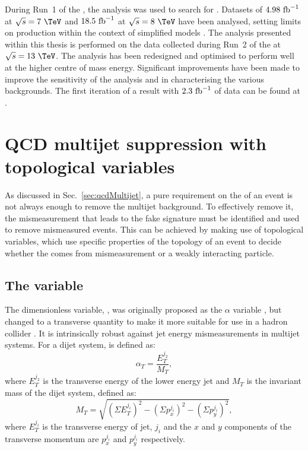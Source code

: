 During Run~1 of the \LHC, the \alphat analysis was used
to search for \SUSY. Datasets of $4.98~\text{fb}^{-1}$ at
$\sqrt{s}=7~\tev$ and $18.5~\text{fb}^{-1}$ at $\sqrt{s}=8~\tev$ have been
analysed, setting limits on \SUSY production within the context of
simplified models
\cite{Chatrchyan:2011zy,Khachatryan:2011tk,Chatrchyan:2012wa,Chatrchyan:2013mys,Khachatryan:2016pxa}.
The analysis presented within this thesis is performed on the data
collected during Run~2 of the \LHC at $\sqrt{s}=13~\tev$. The analysis
has been redesigned and optimised to perform well at the higher centre
of mass energy. Significant improvements have been made to improve the
sensitivity of the analysis and in characterising the various
backgrounds. The first iteration of a result with $2.3~\text{fb}^{-1}$ of data
can be found at \cite{CMS:2015dbr}.

\section{QCD multijet suppression with topological variables} %
\label{sec:topoVars}

As discussed in Sec.~\ref{sec:qcdMultijet}, a pure requirement on the
\MET of an event is not always enough to remove the \QCD multijet
background.  To effectively remove it, the mismeasurement that leads
to the fake \MET signature must be identified and used to remove
mismeasured events. This can be achieved by making use of topological
variables, which use specific properties of the topology of an event to
decide whether the \MET comes from mismeasurement or a weakly
interacting particle. 

\subsection{The \alphat variable}

The dimensionless variable, \alphat, was originally proposed as the
$\alpha$ variable \cite{Randall:2008rw}, but changed to a transverse
quantity to make it more suitable for use in a hadron collider
\cite{CMS-PAS-SUS-08-005,CMS-PAS-SUS-09-001}. It is intrinsically
robust against jet energy mismeasurements in multijet systems. For a
dijet system, \alphat is defined as: 
\begin{equation}
\alpha_T=\frac{E_T^{j_2}}{M_T}, 
\end{equation} 
where $E_T^{j_2}$ is the transverse energy of the lower energy jet and
$M_T$ is the invariant mass of the dijet
system, defined as:
\begin{equation}
M_T=\sqrt{(\Sigma E_T^{j_i})^2-(\Sigma p_x^{j_i})^2-(\Sigma
p_y^{j_i})^2},
\end{equation}
where $E_T^{j_i}$ is the transverse energy of jet, $j_i$ and the $x$
and $y$ components of the transverse momentum are $p_x^{j_i}$ and
$p_y^{j_i}$ respectively.

